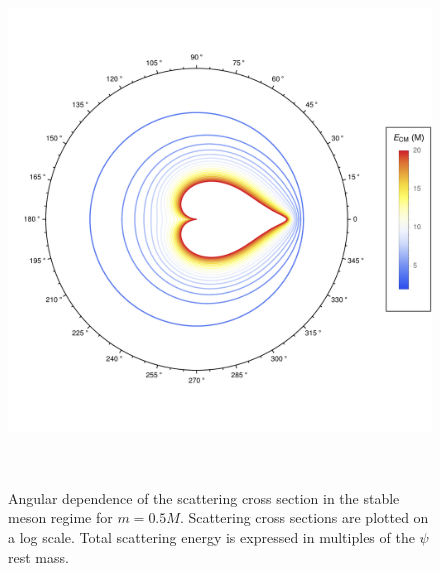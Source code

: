 \documentclass[12pt]{extarticle}
\begin{document}
\begin{figure}
\begin{center}
\vspace*{-2cm}
\includegraphics[width=14cm, height=14cm]{StableMeson-LowEnergy-Polar}
\caption{Angular dependence of the scattering cross section in the stable meson regime for $m = 0.5 M$. Scattering cross sections are plotted on a log scale. Total scattering energy is expressed in multiples of the $\psi$ rest mass.} 
\label{stable-angular}
\end{center}
\end{figure}
\end{document}
